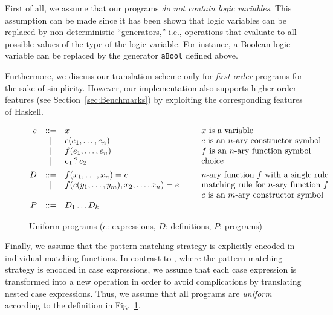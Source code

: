\documentclass{llncs}
\newcommand{\code}[1]{\mbox{\small\texttt{#1}}}
\newcommand{\Choice}[2]{#1 \mathop{?} #2}
\begin{document}
\label{sec:no-logic-vars}
First of all, we assume that our programs
\emph{do not contain logic variables}.
This assumption can be made since it has been shown
\cite{AntoyHanus06ICLP} that logic variables can be replaced
by non-deterministic ``generators,''
i.e., operations that evaluate to all possible values of the type of
the logic variable. For instance, a Boolean logic variable
can be replaced by the generator \code{aBool} defined above.

Furthermore, we discuss our translation scheme only for \emph{first-order}
programs for the sake of simplicity.
However, our implementation also supports higher-order features
(see Section~\ref{sec:Benchmarks}) by exploiting the corresponding
features of Haskell.

\begin{figure}[t]
\[
\begin{array}{@{}rcl@{~~~~~~~~}l}
  e & ::= & x & \mbox{$x$ is a variable}\\
    &  |  & c(e_1,\ldots,e_n) & \mbox{$c$ is an $n$-ary constructor symbol}\\
    &  |  & f(e_1,\ldots,e_n) & \mbox{$f$ is an $n$-ary function symbol}\\
    &  |  & \Choice{e_1}{e_2} & \mbox{choice} \\[1ex]
  D & ::= & f(x_1,\ldots,x_n) = e
                & \mbox{$n$-ary function $f$ with a single rule}\\
    &  |  & f(c(y_1,\ldots,y_m),x_2,\ldots,x_n) = e
                & \mbox{matching rule for $n$-ary function $f$}\\
    &     & & \mbox{$c$ is an $m$-ary constructor symbol}\\
  P & ::= & D_1 \ldots D_k
\end{array}
\]
\caption{Uniform programs ($e$: expressions, $D$: definitions, $P$: programs)}
\label{fig:uniform}
\end{figure}
%
Finally, we assume that the pattern matching strategy
is explicitly encoded in individual matching functions.
In contrast to \cite{AlbertHanusHuchOliverVidal05},
where the pattern matching strategy is encoded in case expressions,
we assume that each case expression is transformed into
a new operation in order to avoid complications by translating
nested case expressions.
Thus, we assume that all programs are \emph{uniform}
according to the definition in Fig.~\ref{fig:uniform}.
\end{document}
